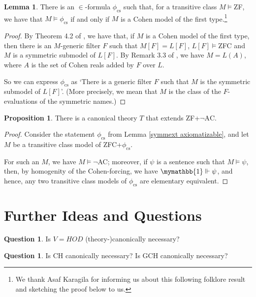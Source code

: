 \documentclass[a4paper,12pt]{amsart}
\theoremstyle{definition}
\newtheorem{lemma}[fact]{Lemma}
\newtheorem{prop}[fact]{Proposition}
\newtheorem{question}[fact]{Question}
\begin{document}
\begin{lemma}{\label{symmext axiomatizable}}
There is an $\in$-formula $\phi_{\text{cs}}$ such that, for a transitive class $M\models$ZF, we have that $M\models\phi_{\text{cs}}$ if and only if $M$ is a Cohen model of the first type.\footnote{We thank Asaf Karagila for informing us about this following folklore result and sketching the proof below to us.} 
\end{lemma}
\begin{proof}
By Theorem 4.2 of 
\cite{KS}, we have that, if $M$ is a Cohen model of the first type, then there is an $M$-generic filter $F$ such that $M[F]=L[F]$, $L[F]\models$ZFC and $M$ is a symmetric submodel of $L[F]$. By Remark 3.3 of \cite{KS}, we have $M=L(A)$, where $A$ is the set of Cohen reals added by $F$ over $L$. 

So we can express $\phi_{\text{cs}}$ as `There is a generic filter $F$ such that $M$ is the symmetric submodel of $L[F]$'. (More precisely, we mean that $M$ is the class of the $F$-evaluations of the symmetric names.)  
\end{proof}

\begin{prop}{\label{tc choice}}
There is a canonical theory $T$ that extends ZF+$\neg\text{AC}$.
\end{prop}
\begin{proof}

Consider the statement $\phi_{\text{cs}}$ from Lemma \ref{symmext axiomatizable}, and let $M$ be a transitive class model of ZFC+$\phi_{\text{cs}}$. 

For such an $M$, we have $M\models\neg$AC; moreover, if $\psi$ is a sentence such that $M\models\psi$, then, by homogenity of the Cohen-forcing, we have $\mymathbb{1}\Vdash\psi$, and hence, any two transitive class models of $\phi_{\text{cs}}$ are elementary equivalent.

\end{proof}




\section{Further Ideas and Questions}



\begin{question}
Is $V=HOD$ (theory-)canonically necessary?
\end{question}

\begin{question}
Is CH canonically necessary? Is GCH canonically necessary? 
\end{question}
\end{document}
